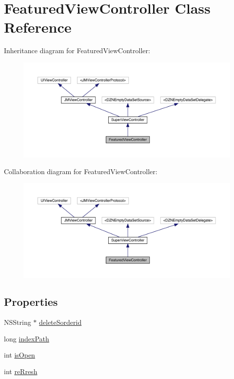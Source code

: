 \hypertarget{interface_featured_view_controller}{}\section{Featured\+View\+Controller Class Reference}
\label{interface_featured_view_controller}


Inheritance diagram for Featured\+View\+Controller\+:\nopagebreak
\begin{figure}[H]
\begin{center}
\leavevmode
\includegraphics[width=350pt]{interface_featured_view_controller__inherit__graph}
\end{center}
\end{figure}


Collaboration diagram for Featured\+View\+Controller\+:\nopagebreak
\begin{figure}[H]
\begin{center}
\leavevmode
\includegraphics[width=350pt]{interface_featured_view_controller__coll__graph}
\end{center}
\end{figure}
\subsection*{Properties}
\begin{DoxyCompactItemize}
\item 
N\+S\+String $\ast$ \mbox{\hyperlink{interface_featured_view_controller_a514984f8234bc9d30424a6fd05696239}{delete\+Sorderid}}
\item 
long \mbox{\hyperlink{interface_featured_view_controller_add791e2a55bddd52807ea47881ca1cb2}{index\+Path}}
\item 
int \mbox{\hyperlink{interface_featured_view_controller_a351d12f760eebc3ea5bdf2a118c853d7}{is\+Open}}
\item 
int \mbox{\hyperlink{interface_featured_view_controller_a492cb2bf9a5415557923b51ba187f783}{re\+Rresh}}
\end{DoxyCompactItemize}
